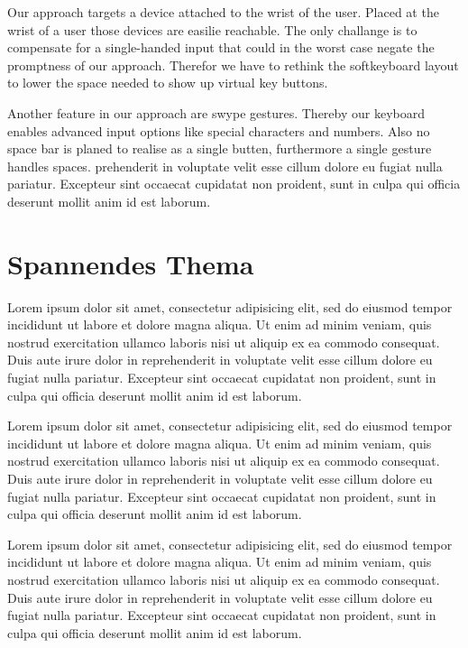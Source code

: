 \documentclass[10pt,a4paper,compsoc]{IEEEtran}
\begin{document}
Our approach targets a device attached to the wrist of the user. Placed at the wrist of a user those devices are easilie reachable. The only challange is to compensate for a single-handed input that could in the worst case negate the promptness of our approach. Therefor we have to rethink the softkeyboard layout to lower the space needed to show up virtual key buttons.

Another feature in our approach are swype gestures. Thereby our keyboard enables advanced input options like special characters and numbers. Also no space bar is planed to realise as a single butten, furthermore a single gesture handles spaces. prehenderit in voluptate velit esse cillum dolore eu fugiat nulla pariatur. Excepteur sint occaecat cupidatat non proident, sunt in culpa qui officia deserunt mollit anim id est laborum.

\section{Spannendes Thema}

Lorem ipsum dolor sit amet, consectetur adipisicing elit, sed do eiusmod tempor incididunt ut labore et dolore magna aliqua. Ut enim ad minim veniam, quis nostrud exercitation ullamco laboris nisi ut aliquip ex ea commodo consequat. Duis aute irure dolor in reprehenderit in voluptate velit esse cillum dolore eu fugiat nulla pariatur. Excepteur sint occaecat cupidatat non proident, sunt in culpa qui officia deserunt mollit anim id est laborum.

Lorem ipsum dolor sit amet, consectetur adipisicing elit, sed do eiusmod tempor incididunt ut labore et dolore magna aliqua. Ut enim ad minim veniam, quis nostrud exercitation ullamco laboris nisi ut aliquip ex ea commodo consequat. Duis aute irure dolor in reprehenderit in voluptate velit esse cillum dolore eu fugiat nulla pariatur. Excepteur sint occaecat cupidatat non proident, sunt in culpa qui officia deserunt mollit anim id est laborum.

Lorem ipsum dolor sit amet, consectetur adipisicing elit, sed do eiusmod tempor incididunt ut labore et dolore magna aliqua. Ut enim ad minim veniam, quis nostrud exercitation ullamco laboris nisi ut aliquip ex ea commodo consequat. Duis aute irure dolor in reprehenderit in voluptate velit esse cillum dolore eu fugiat nulla pariatur. Excepteur sint occaecat cupidatat non proident, sunt in culpa qui officia deserunt mollit anim id est laborum.



\end{document}
